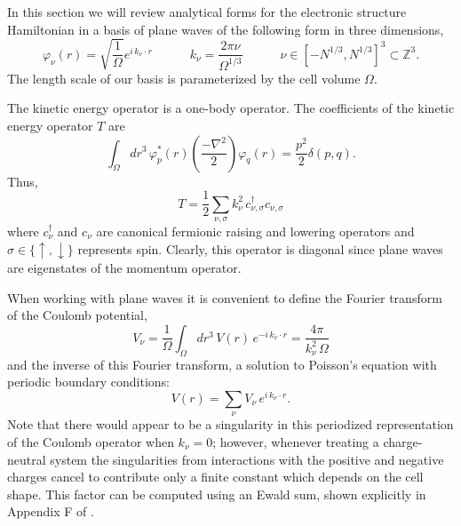 \documentclass[superscriptaddress,aps,pra,nofootinbib,notitlepage,10pt,longbibliography]{revtex4-1}
\begin{document}
In this section we will review analytical forms for the electronic structure Hamiltonian in a basis of plane waves of the following form in three dimensions,
\begin{equation}
\varphi_\nu \left(r\right) = \sqrt{\frac{1}{\Omega}} e^{i \, k_\nu \cdot r}
\quad \quad \quad
k_\nu = \frac{2 \pi \nu}{\Omega^{1/3}}
\quad \quad \quad 
\nu \in \left[-N^{1/3}, N^{1/3}\right]^3 \subset \mathbb{Z}^3.
\end{equation}
The length scale of our basis is parameterized by the cell volume $\Omega$.

The kinetic energy operator is a one-body operator. The coefficients of the kinetic energy operator $T$ are
\begin{equation}
\int_\Omega dr^3 \, \varphi_p^*\left(r\right) \left(\frac{-\nabla^2}{2}\right) \varphi_q\left(r\right) =  \frac{p^2}{2}\delta\left(p,q\right).
\end{equation}
Thus,
\begin{equation}
\label{eq:pw_t}
T = \frac{1}{2} \sum_{\nu, \sigma} k_\nu^2 \, c_{\nu,\sigma}^\dagger c_{\nu,\sigma}
\end{equation}
where $c^\dagger_\nu$ and $c_\nu$ are canonical fermionic raising and lowering operators and $\sigma \in \{\uparrow, \downarrow\}$ represents spin. Clearly, this operator is diagonal since plane waves are eigenstates of the momentum operator.

When working with plane waves it is convenient to define the Fourier transform of the Coulomb potential,
\begin{equation}
V_\nu =  \frac{1}{\Omega} \int_\Omega dr^3 \, V(r) \, e^{-i \, k_\nu \cdot r} = \frac{4\pi}{k_\nu^2 \, \Omega}
\end{equation}
and the inverse of this Fourier transform, a solution to Poisson's equation with periodic boundary conditions:
\begin{equation}
V\left(r\right) = \sum_\nu V_\nu \, e^{i \, k_\nu \cdot r}.
\label{eq:period_col}
\end{equation}
Note that there would appear to be a singularity in this periodized representation of the Coulomb operator when $k_\nu = 0$; however, whenever treating a charge-neutral system the singularities from interactions with the positive and negative charges cancel to contribute only a finite constant which depends on the cell shape. This factor can be computed using an Ewald sum, shown explicitly in Appendix F of \cite{Martin2004}.
\end{document}
